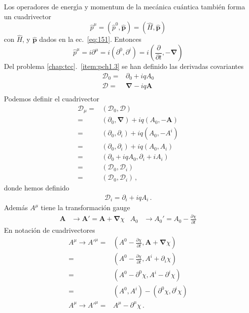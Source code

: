 Los operadores de energ\'\i a y momentum de la mec\'anica cu\'antica tambi\'en forma un cuadrivector
\begin{equation}
  \hat p^\mu=({\hat p}^0,\hat{\mathbf{p}})=(\widehat H,\hat{\mathbf{p}})
\end{equation}
con $\widehat H$, y $\hat{\mathbf{p}}$ dados en la ec.~\eqref{eq:151}. Entonces
\begin{equation}
  \label{eq:cv_hatpmu}
  \hat{p}^\mu=i\partial^\mu=i(\partial^0,\partial^i)=i(\frac{\partial}{\partial t},-\boldsymbol{\nabla})
\end{equation}
Del problema \ref{chap:tcc}.~\ref{item:pch1.3} se han definido las derivadas covariantes
\begin{align}
   \mathcal{D}_0=&\partial_0+i q A_0\nonumber\\
  \boldsymbol{\mathcal{D}}=&\boldsymbol{\nabla}-i q \mathbf{A}\nonumber\\
\end{align}
Podemos definir el cuadrivector
\begin{align}
  \mathcal{D}_\mu=&(\mathcal{D}_0,\boldsymbol{\mathcal{D}})\nonumber\\
=&(\partial_0,\boldsymbol{\nabla})+i q(A_0,-\mathbf{A})\nonumber\\
=&(\partial_0,\partial_i)+i q(A_0,-A^i)\nonumber\\
=&(\partial_0,\partial_i)+i q(A_0,A_i)\nonumber\\
=&(\partial_0+i q A_0,\partial_i+i A_i)\nonumber\\
=&(\mathcal{D}_0,\mathcal{D}_i)\nonumber\\
=&(\mathcal{D}_0,\mathcal{D}_i)\,,
\end{align}
donde hemos definido
\begin{align}
  \mathcal{D}_i=\partial_i+i q A_i\,.
\end{align}
Adem\'as $A^\mu$ tiene la transformaci\'on gauge
\begin{align}
  \mathbf{A}&\to\mathbf{A}'=\mathbf{A}+\boldsymbol{\nabla}\chi&
  A_0&\to A_0'=A_0-\frac{\partial\chi}{\partial t} 
\end{align}
En notaci\'on de cuadrivectores
\begin{align}
\label{eq:166qft}
  A^\mu\to {A'}^\mu=&\left(A^0-\frac{\partial\chi}{\partial t},\mathbf{A}+\boldsymbol{\nabla}\chi
  \right)\nonumber\\
  =&\left(A^0-\frac{\partial\chi}{\partial t},A^{i}+\partial_i\chi
  \right)\nonumber\\
  =&\left(A^0-\partial^0\chi,A^{i}-\partial^{i}\chi
  \right)\nonumber\\
  =&\left(A^0,A^{i}
  \right)-
  \left(
    \partial^0\chi,\partial^{i}\chi
  \right)\nonumber\\
  A^\mu\to {A'}^\mu=&A^\mu-\partial^\mu\chi\,.
\end{align}

